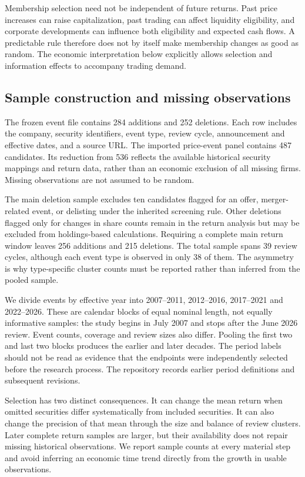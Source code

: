 Membership selection need not be independent of future returns. Past price increases can raise capitalization, past trading can affect liquidity eligibility, and corporate developments can influence both eligibility and expected cash flows. A predictable rule therefore does not by itself make membership changes as good as random. The economic interpretation below explicitly allows selection and information effects to accompany trading demand.

\subsection{Sample construction and missing observations}

The frozen event file contains 284 additions and 252 deletions. Each row includes the company, security identifiers, event type, review cycle, announcement and effective dates, and a source URL. The imported price-event panel contains 487 candidates. Its reduction from 536 reflects the available historical security mappings and return data, rather than an economic exclusion of all missing firms. Missing observations are not assumed to be random.



The main deletion sample excludes ten candidates flagged for an offer, merger-related event, or delisting under the inherited screening rule. Other deletions flagged only for changes in share counts remain in the return analysis but may be excluded from holdings-based calculations. Requiring a complete main return window leaves 256 additions and 215 deletions. The total sample spans 39 review cycles, although each event type is observed in only 38 of them. The asymmetry is why type-specific cluster counts must be reported rather than inferred from the pooled sample.

We divide events by effective year into 2007--2011, 2012--2016, 2017--2021 and 2022--2026. These are calendar blocks of equal nominal length, not equally informative samples: the study begins in July 2007 and stops after the June 2026 review. Event counts, coverage and review sizes also differ. Pooling the first two and last two blocks produces the earlier and later decades. The period labels should not be read as evidence that the endpoints were independently selected before the research process. The repository records earlier period definitions and subsequent revisions.

Selection has two distinct consequences. It can change the mean return when omitted securities differ systematically from included securities. It can also change the precision of that mean through the size and balance of review clusters. Later complete return samples are larger, but their availability does not repair missing historical observations. We report sample counts at every material step and avoid inferring an economic time trend directly from the growth in usable observations.

